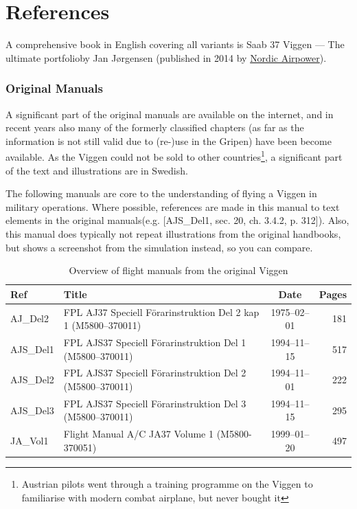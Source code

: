 \documentclass[a4paper]{report}
\begin{document}
\appendix

\chapter{References}

A comprehensive book in English covering all variants is \glqq Saab 37 Viggen --- The ultimate portfolio\grqq by Jan Jørgensen (published in 2014 by \href{http://www.nordicairpower.com/}{Nordic Airpower}).

\subsection{Original Manuals}
A significant part of the original manuals are available on the internet, and in recent years also many of the formerly classified chapters (as far as the information is not still valid due to (re-)use in the Gripen) have been become available. As the Viggen could not be sold to other countries\footnote{Austrian pilots went through a training programme on the Viggen to familiarise with modern combat airplane, but never bought it}, a significant part of the text and illustrations are in Swedish.

The following manuals are core to the understanding of flying a Viggen in military operations. Where possible, references are made in this manual to text elements in the original manuals(e.g. [AJS\_Del1, sec. 20, ch. 3.4.2, p. 312]). Also, this manual does typically not repeat illustrations from the original handbooks, but shows a screenshot from the simulation instead, so you can compare.

\begin{table}[!th]
\begin{tabular}{|l|l|c|r|}
\hline
Ref & Title & Date & Pages \\
\hline
AJ\_Del2 & FPL AJ37 Speciell Förarinstruktion Del 2 kap 1 (M5800--370011) & 1975--02--01 & 181 \\
AJS\_Del1 & FPL AJS37 Speciell Förarinstruktion Del 1 (M5800--370011) & 1994--11--15 & 517 \\
AJS\_Del2 & FPL AJS37 Speciell Förarinstruktion Del 2 (M5800--370011) & 1994--11--01 & 222 \\
AJS\_Del3 & FPL AJS37 Speciell Förarinstruktion Del 3 (M5800--370011) & 1994--11--15 & 295 \\
JA\_Vol1 & Flight Manual A/C JA37 Volume 1 (M5800-370051) & 1999--01--20 & 497 \\
\hline
\end{tabular}
\caption{Overview of flight manuals from the original Viggen}
\end{table}
\end{document}

